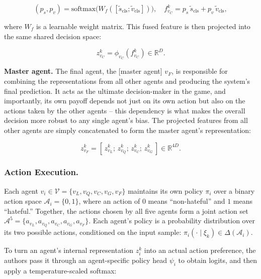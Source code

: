 \documentclass[manuscript,review]{acmart}
\begin{document}
\begin{equation}
(p_s, p_v) = \text{softmax}\big(W_f([\tilde{s}_{\text{cls}}; \tilde{v}_{\text{cls}}])\big), \quad
f_{v_C}^k = p_s\, \tilde{s}_{\text{cls}} + p_v\, \tilde{v}_{\text{cls}},
\end{equation}

where $W_f$ is a learnable weight matrix. This fused feature is then projected into the
same shared decision space:

\begin{equation}
z_{v_C}^k = \phi_{v_C}(f_{v_C}^k) \in \mathbb{R}^D.
\end{equation}

\textbf{Master agent.} The final agent, the [master agent] $v_F$, is responsible for
combining the representations from all other agents and producing the system's final
prediction. It acts as the ultimate decision-maker in the game, and importantly, its own
payoff depends not just on its own action but also on the actions taken by the other
agents -- this dependency is what makes the overall decision more robust to any single
agent's bias. The projected features from all other agents are simply concatenated to
form the master agent's representation:

\begin{equation}
z_{v_F}^k = [\, z_{v_L}^k;\, z_{v_Q}^k;\, z_{v_C}^k;\, z_{v_G}^k \,] \in \mathbb{R}^{4D}.
\end{equation}

\subsubsection{\textbf{Action Execution.} \newline}

Each agent $v_i \in \mathcal{V} = \{v_L, v_Q, v_C, v_G, v_F\}$ maintains its own policy
$\pi_i$ over a binary action space $\mathcal{A}_i = \{0, 1\}$, where an action of $0$
means ``non-hateful'' and $1$ means ``hateful.'' Together, the actions chosen by all five
agents form a joint action set $\mathcal{A}^5 = \{a_{v_L}, a_{v_Q}, a_{v_C}, a_{v_G},
a_{v_F}\}$. Each agent's policy is a probability distribution over its two possible
actions, conditioned on the input sample: $\pi_i(\cdot \mid \xi_k) \in \Delta(\mathcal{A}_i)$.

To turn an agent's internal representation $z_i^k$ into an actual action preference, the
authors pass it through an agent-specific policy head $\psi_i$ to obtain logits, and then
apply a temperature-scaled softmax:
\end{document}
